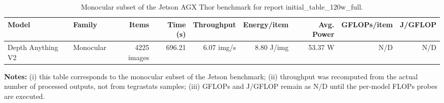 \begin{table}[t]
\centering
\caption{Monocular subset of the Jetson AGX Thor benchmark for report initial_table_120w_full.}
\label{tab:initial_table_120w_full:monocular}
\begin{tabular}{l l r r r r r r r}
\hline
Model & Family & Items & Time (s) & Throughput & Energy/item & Avg. Power & GFLOPs/item & J/GFLOP \\
\hline
Depth Anything V2 & Monocular & 4225 images & 696.21 & 6.07 img/s & 8.80 J/img & 53.37 W & N/D & N/D \\
\hline
\end{tabular}
\vspace{0.4em}

\parbox{0.96\linewidth}{\footnotesize
\textbf{Notes:}
(i) this table corresponds to the monocular subset of the Jetson benchmark;
(ii) throughput was recomputed from the actual number of processed outputs, not from tegrastats samples;
(iii) GFLOPs and J/GFLOP remain as N/D until the per-model FLOPs probes are executed.}
\end{table}
